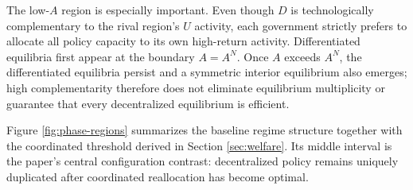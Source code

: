 The low-$A$ region is especially important. Even though $D$ is technologically complementary to the rival region's $U$ activity, each government strictly prefers to allocate all policy capacity to its own high-return activity. Differentiated equilibria first appear at the boundary $A=A^N$. Once $A$ exceeds $A^N$, the differentiated equilibria persist and a symmetric interior equilibrium also emerges; high complementarity therefore does not eliminate equilibrium multiplicity or guarantee that every decentralized equilibrium is efficient.

Figure \ref{fig:phase-regions} summarizes the baseline regime structure together with the coordinated threshold derived in Section \ref{sec:welfare}. Its middle interval is the paper's central configuration contrast: decentralized policy remains uniquely duplicated after coordinated reallocation has become optimal.


